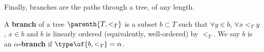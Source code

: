 Finally, branches are the paths through a tree, of any length.

\begin{boxdefinition}[Branch]
    A \textbf{branch} of a tree $\parenth{T, <_T}$ is a subset $b \subset T$ such that $\forall y \in b$, $\forall x <_T y$, $x \in b$ and $b$ is linearly ordered (equivalently, well-ordered) by $<_T$. We say $b$ is an \textbf{$\alpha$-branch} if $\type\of{b, <_T} = \alpha$.
\end{boxdefinition}
